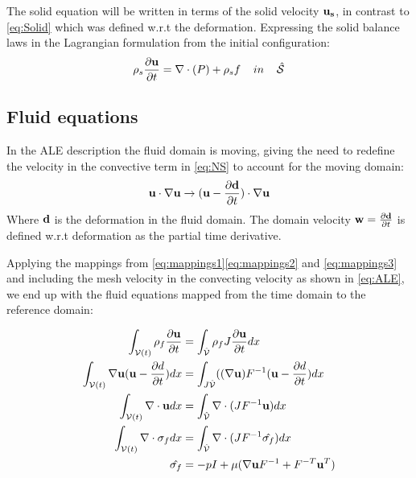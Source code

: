 The solid equation will be written in terms of the solid velocity $\bold{u_s}$, in contrast to \ref{eq:Solid} which was defined w.r.t the deformation.
Expressing the solid balance laws in the Lagrangian formulation from the initial configuration:
\begin{equation} \label{eq:solid}
\rho_s \frac{\partial \bold{u}}{\partial t} = \nabla \cdot (P) + \rho_s f \hspace{4mm}in\hspace{4mm} \hat{\mathcal{S}} 
\end{equation}
\subsection{Fluid equations}
In the ALE description the fluid domain is moving, giving the need to redefine the velocity in the convective term in \eqref{eq:NS} to account for the moving domain: 
\begin{equation}
\bold{u} \cdot \nabla \bold{u} \rightarrow (\bold{u}-\frac{\partial \bold{d}}{\partial t}) \cdot \nabla \bold{u}  
\end{equation}
Where $\bold{d}$ is the deformation in the fluid domain. The domain velocity $\bold{w} = \frac{\partial \bold{d}}{\partial t}$ is defined w.r.t deformation as the partial time derivative.

Applying the mappings from \eqref{eq:mappings1}\eqref{eq:mappings2} and \eqref{eq:mappings3} and including the mesh velocity in the convecting velocity as shown in \eqref{eq:ALE}, we end up with the fluid equations mapped from the time domain to the reference domain:

\begin{align}
\int_{\mathcal{V}(t)} \rho_f \frac{\partial \bold{u}}{\partial t}  & = \int_{\hat{\mathcal{V}}}  \rho_f J \frac{\partial \bold{u}}{\partial t} dx \\
\int_{\mathcal{V}(t)} \nabla \bold{u} (\bold{u}-\frac{\partial d}{\partial t}) dx  &= \int_{J \hat{\mathcal{V}}} ((\nabla \bold{u})F^{-1}(\bold{u}-\frac{\partial d}{\partial t}) dx  \\
\int_{\mathcal{V}(t)} \nabla \cdot \bold{u} dx  &=\int_{\hat{\mathcal{V}}}  \nabla \cdot (J F^{-1} \bold{u}  ) dx \\
\int_{\mathcal{V}(t)} \nabla \cdot \sigma_f dx &= \int_{\hat{\mathcal{V}}} \nabla \cdot( J F^{-1} \hat{\sigma_f} )     dx \\
\hat{\sigma_f} &= -pI + \mu ( \nabla \bold{u} F^{-1} + F^{-T} \bold{u}^{T}  ) 
\end{align}

